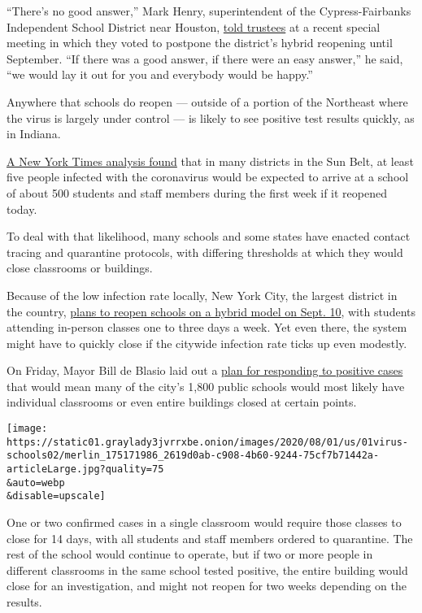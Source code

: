 ``There's no good answer,'' Mark Henry, superintendent of the
Cypress-Fairbanks Independent School District near Houston,
\href{https://www.cfisd.net/en/board-trustees/board-meetings-agendas}{told
trustees} at a recent special meeting in which they voted to postpone
the district's hybrid reopening until September. ``If there was a good
answer, if there were an easy answer,'' he said, ``we would lay it out
for you and everybody would be happy.''

Anywhere that schools do reopen --- outside of a portion of the
Northeast where the virus is largely under control --- is likely to see
positive test results quickly, as in Indiana.

\href{https://www.nytimes3xbfgragh.onion/interactive/2020/07/31/us/coronavirus-school-reopening-risk.html}{A
New York Times analysis found} that in many districts in the Sun Belt,
at least five people infected with the coronavirus would be expected to
arrive at a school of about 500 students and staff members during the
first week if it reopened today.

To deal with that likelihood, many schools and some states have enacted
contact tracing and quarantine protocols, with differing thresholds at
which they would close classrooms or buildings.

Because of the low infection rate locally, New York City, the largest
district in the country,
\href{https://www.nytimes3xbfgragh.onion/2020/07/08/nyregion/nyc-schools-reopening-plan.html}{plans
to reopen schools on a hybrid model on Sept. 10}, with students
attending in-person classes one to three days a week. Yet even there,
the system might have to quickly close if the citywide infection rate
ticks up even modestly.

On Friday, Mayor Bill de Blasio laid out a
\href{https://www.nytimes3xbfgragh.onion/2020/07/30/world/coronavirus-covid-19.html\#link-177c5cda}{plan
for responding to positive cases} that would mean many of the city's
1,800 public schools would most likely have individual classrooms or
even entire buildings closed at certain points.

\texttt{[image: https://static01.graylady3jvrrxbe.onion/images/2020/08/01/us/01virus-schools02/merlin\_175171986\_2619d0ab-c908-4b60-9244-75cf7b71442a-articleLarge.jpg?quality=75\\\&auto=webp\\\&disable=upscale]}

One or two confirmed cases in a single classroom would require those
classes to close for 14 days, with all students and staff members
ordered to quarantine. The rest of the school would continue to operate,
but if two or more people in different classrooms in the same school
tested positive, the entire building would close for an investigation,
and might not reopen for two weeks depending on the results.

